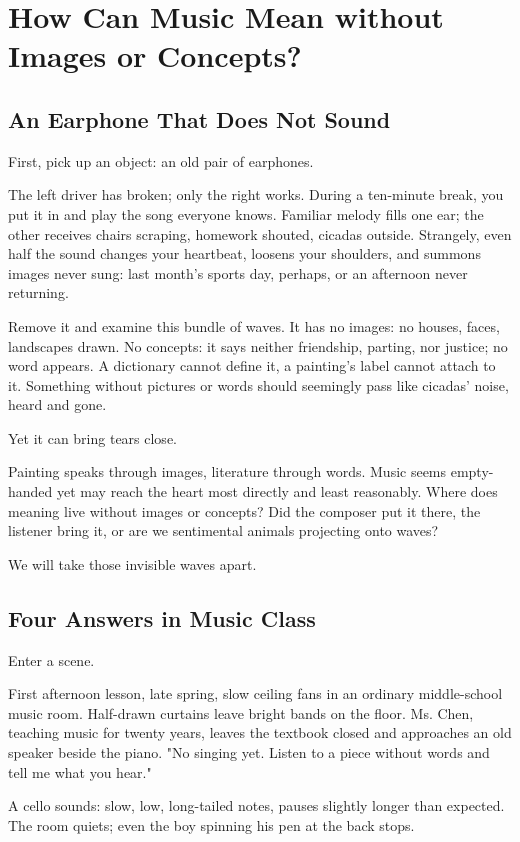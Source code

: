 \chapter[Music's Meaning beyond Concepts]{How Can Music Mean without Images or Concepts?}
\section{An Earphone That Does Not Sound}
First, pick up an object: an old pair of earphones.

The left driver has broken; only the right works. During a ten-minute break, you put it in and play the song everyone knows. Familiar melody fills one ear; the other receives chairs scraping, homework shouted, cicadas outside. Strangely, even half the sound changes your heartbeat, loosens your shoulders, and summons images never sung: last month's sports day, perhaps, or an afternoon never returning.

Remove it and examine this bundle of waves. It has no images: no houses, faces, landscapes drawn. No concepts: it says neither friendship, parting, nor justice; no word appears. A dictionary cannot define it, a painting's label cannot attach to it. Something without pictures or words should seemingly pass like cicadas' noise, heard and gone.

Yet it can bring tears close.

Painting speaks through images, literature through words. Music seems empty-handed yet may reach the heart most directly and least reasonably. Where does meaning live without images or concepts? Did the composer put it there, the listener bring it, or are we sentimental animals projecting onto waves?

We will take those invisible waves apart.

\section{Four Answers in Music Class}
Enter a scene.

First afternoon lesson, late spring, slow ceiling fans in an ordinary middle-school music room. Half-drawn curtains leave bright bands on the floor. Ms. Chen, teaching music for twenty years, leaves the textbook closed and approaches an old speaker beside the piano. "No singing yet. Listen to a piece without words and tell me what you hear."

A cello sounds: slow, low, long-tailed notes, pauses slightly longer than expected. The room quiets; even the boy spinning his pen at the back stops.


